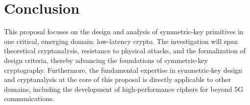 \section*{Conclusion}
This proposal focuses on the design and analysis of symmetric-key primitives in one critical, emerging domain: low-latency crypto.
The investigation will span theoretical cryptanalysis, resistance to physical attacks, and the formalization of design criteria, thereby advancing the foundations of symmetric-key cryptography.
Furthermore, the fundamental expertise in symmetric-key design and cryptanalysis at the core of this proposal is directly applicable to other domains, including the development of high-performance ciphers for beyond 5G communications.

\pagebreak



